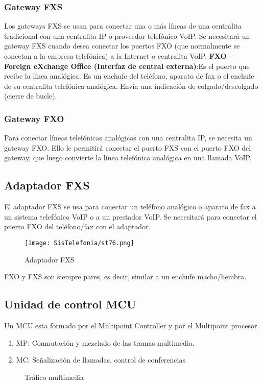 \documentclass[
	12pt, %
	fleqn, %
	a4paper, %
	oneside, %
]{LegrandOrangeBook}
\begin{document}
\subsubsection{Gateway FXS}
Los gateways FXS se usan para conectar una o más líneas de una centralita tradicional con una centralita IP o proveedor telefónico VoIP. 
Se necesitará un gateway FXS cuando desea conectar los puertos FXO (que normalmente se conectan a la empresa telefónica) a la Internet o centralita VoIP.
\textbf{FXO – Foreign eXchange Office (Interfaz de central externa)}:Es el puerto que recibe la línea analógica. Es un enchufe del teléfono, aparato de fax o el enchufe de su centralita telefónica analógica. Envía una indicación de colgado/descolgado (cierre de bucle).
\subsubsection{Gateway FXO}
Para conectar líneas telefónicas analógicas con una centralita IP, se necesita un gateway FXO.
Ello le permitirá conectar el puerto FXS con el puerto FXO del gateway, que luego convierte la línea telefónica analógica en una llamada VoIP.
\subsection{Adaptador FXS}
El adaptador FXS se usa para conectar un teléfono analógico o aparato de fax a un sistema telefónico VoIP o a un prestador VoIP.
Se necesitará para conectar el puerto FXO del teléfono/fax con el adaptador.
\begin{figure}[H]
\centering
\texttt{[image: SisTelefonia/st76.png]}
\caption{Adaptador FXS}
\label{fig:adaptadorfsx}
\end{figure}
FXO y FXS son siempre pares, es decir, similar a un enchufe macho/hembra.
\subsection{Unidad de control MCU}
Un MCU esta formado por el Multipoint Controller y por el Multipoint procesor.
\begin{enumerate}
\item MP: Conmutación y mezclado de las tramas multimedia.
\item MC: Señalización de llamadas, control de conferencias
\end{enumerate}
\begin{figure}[H]
\centering
{}
\caption{Tráfico multimedia}
\end{figure}
\end{document}
